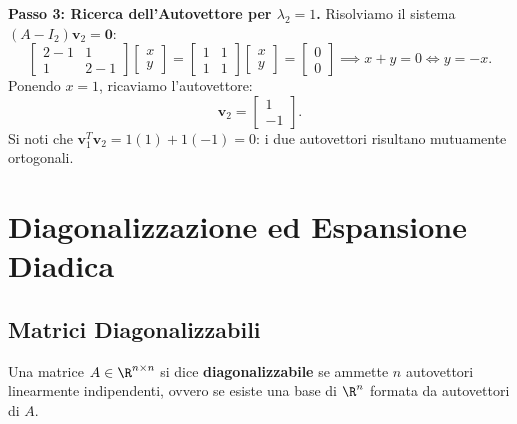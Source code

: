 \begin{example}
\noindent\textbf{Passo 3: Ricerca dell'Autovettore per $\lambda_2 = 1$.}
Risolviamo il sistema $(A - I_2)\mathbf{v}_2 = \mathbf{0}$:
\begin{equation}
    \begin{bmatrix} 2-1 & 1 \\ 1 & 2-1 \end{bmatrix} \begin{bmatrix} x \\ y \end{bmatrix} = \begin{bmatrix} 1 & 1 \\ 1 & 1 \end{bmatrix} \begin{bmatrix} x \\ y \end{bmatrix} = \begin{bmatrix} 0 \\ 0 \end{bmatrix} \implies x + y = 0 \iff y = -x.
\end{equation}
Ponendo $x = 1$, ricaviamo l'autovettore:
\begin{equation}
    \mathbf{v}_2 = \begin{bmatrix} 1 \\ -1 \end{bmatrix}.
\end{equation}
Si noti che $\mathbf{v}_1^T \mathbf{v}_2 = 1(1) + 1(-1) = 0$: i due autovettori risultano mutuamente ortogonali.
\end{example}

\FloatBarrier
\section{Diagonalizzazione ed Espansione Diadica}

\subsection{Matrici Diagonalizzabili}

\begin{definition}[Diagonalizzabilit\`a]
Una matrice $A \in \R^{n \times n}$ si dice \textbf{diagonalizzabile} se ammette $n$ autovettori linearmente indipendenti, ovvero se esiste una base di $\R^n$ formata da autovettori di $A$.
\end{definition}

